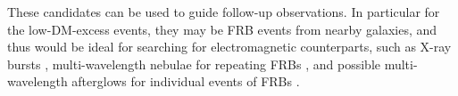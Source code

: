 \documentclass[fleqn,usenatbib]{mnras}
\begin{document}

%



These candidates can be used to guide follow-up observations. In particular for the low-DM-excess events, they may be FRB events from nearby galaxies, and thus would be ideal for searching for electromagnetic counterparts, such as X-ray bursts \citep{HXMT2020,INTEGRAL2020,Konus2020,Geng20,Dai2020ApJ}, multi-wavelength nebulae for repeating FRBs \citep[e.g.][]{Chatterjee17,Wang2020a}, and possible multi-wavelength afterglows for individual events of FRBs \citep{Wang2020a}. 
%
\end{document}
